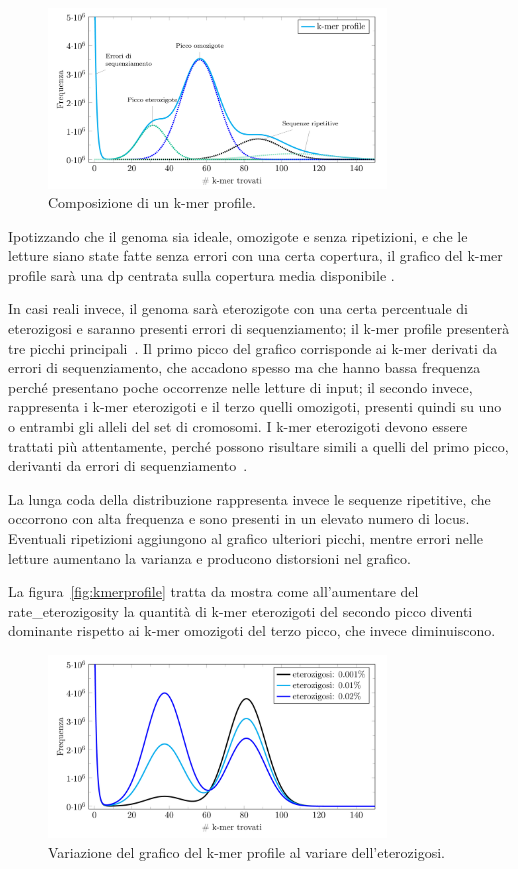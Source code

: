 \documentclass[crop=false, class=book]{standalone}
\begin{document}
	
	\begin{figure}[h]
		\centering
		\includegraphics[width=0.8\textwidth]{capitoli/introduzione/profilecomp.png}
		\caption{Composizione di un k-mer profile.}
		\label{fig:profilecomp}
	\end{figure}
	
	Ipotizzando che il genoma sia ideale, omozigote e senza ripetizioni, e che le letture siano state fatte senza errori con una certa copertura, il grafico del k-mer profile sarà una \gls{dp} centrata sulla copertura media disponibile \cite{li2003estimating}.
	
	In casi reali invece, il genoma sarà eterozigote con una certa percentuale di eterozigosi e saranno presenti errori di sequenziamento; il k-mer profile presenterà tre picchi principali~\cite{sun2017findGSE}.
	Il primo picco del grafico corrisponde ai k-mer derivati da errori di sequenziamento, che accadono spesso ma che hanno bassa frequenza perché presentano poche occorrenze nelle letture di input; il secondo invece, rappresenta i k-mer eterozigoti e il terzo quelli omozigoti, presenti quindi su uno o entrambi gli alleli del set di cromosomi. I k-mer eterozigoti devono essere trattati più attentamente, perché possono risultare simili a quelli del primo picco, derivanti da errori di sequenziamento~\cite{sohn2016present}.	
	
	La lunga coda della distribuzione rappresenta invece le sequenze ripetitive, che occorrono con alta frequenza e sono presenti in un elevato numero di \gls{locus}. Eventuali ripetizioni aggiungono al grafico ulteriori picchi, mentre errori nelle letture aumentano la varianza e producono distorsioni nel grafico.
	
	La figura~\vref{fig:kmerprofile} tratta da \cite{vurture2017genomescope} mostra come all'aumentare del \gls{rate_eterozigosity} la quantità di k-mer eterozigoti del secondo picco diventi dominante rispetto ai k-mer omozigoti del terzo picco, che invece diminuiscono.
	
	\begin{figure}
		\centering
		\includegraphics[width=0.8\textwidth]{capitoli/introduzione/kmerprofile.png}
		\caption{Variazione del grafico del k-mer profile al variare dell'eterozigosi.}
		\label{fig:kmerprofile}
	\end{figure}

	
	
	
	
\end{document}
